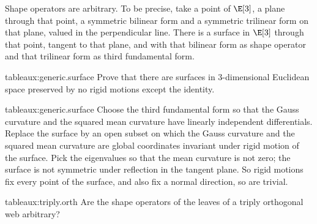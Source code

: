 \begin{theorem}
Shape operators are arbitrary.
To be precise, take a point of \(\E[3]\), a plane through that point, a symmetric bilinear form and a symmetric trilinear form on that plane, valued in the perpendicular line.
There is a surface in \(\E[3]\) through that point, tangent to that plane, and with that bilinear form as shape operator and that trilinear form as third fundamental form.
\end{theorem}
\begin{problem}{tableaux:generic.surface}
Prove that there are surfaces in \(3\)-dimensional Euclidean space preserved by no rigid motions except the identity.
\end{problem}
\begin{answer}{tableaux:generic.surface}
Choose the third fundamental form so that the Gauss curvature and the squared mean curvature have linearly independent differentials.
Replace the surface by an open subset on which the Gauss curvature and the squared mean curvature are global coordinates invariant under rigid motion of the surface.
Pick the eigenvalues so that the mean curvature is not zero; the surface is not symmetric under reflection in the tangent plane.
So rigid motions fix every point of the surface, and also fix a normal direction, so are trivial.
\end{answer}
\begin{problem}{tableaux:triply.orth}
Are the shape operators of the leaves of a triply orthogonal web arbitrary?
\end{problem}

